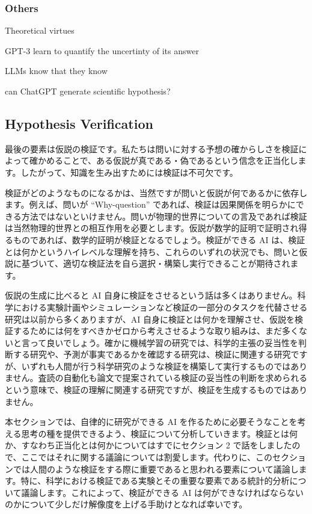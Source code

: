 
\subsubsection{Others}
Theoretical virtues \cite{schindler2022theoretical}

GPT-3 learn to quantify the uncertinty of its answer \cite{lin2022teaching}

LLMs know that they know \cite{kadavath2022language}
 
can ChatGPT generate scientific hypothesis? \cite{park2023can}

\subsection{Hypothesis Verification}
最後の要素は仮説の検証です。私たちは問いに対する予想の確からしさを検証によって確かめることで、ある仮説が真である・偽であるという信念を正当化します。したがって、知識を生み出すためには検証は不可欠です。

検証がどのようなものになるかは、当然ですが問いと仮説が何であるかに依存します。例えば、問いが ``Why-question'' であれば、検証は因果関係を明らかにできる方法ではないといけません。問いが物理的世界についての言及であれば検証は当然物理的世界との相互作用を必要とします。仮説が数学的証明で証明され得るものであれば、数学的証明が検証となるでしょう。検証ができる AI は、検証とは何かというハイレベルな理解を持ち、これらのいずれの状況でも、問いと仮説に基づいて、適切な検証法を自ら選択・構築し実行できることが期待されます。

仮説の生成に比べると AI 自身に検証をさせるという話は多くはありません。科学における実験計画やシミュレーションなど検証の一部分のタスクを代替させる研究は以前から多くありますが、AI 自身に検証とは何かを理解させ、仮説を検証するためには何をすべきかゼロから考えさせるような取り組みは、まだ多くないと言って良いでしょう。確かに機械学習の研究では、科学的主張の妥当性を判断する研究や、予測が事実であるかを確認する研究は、検証に関連する研究ですが、いずれも人間が行う科学研究のような検証を構築して実行するものではありません。査読の自動化も論文で提案されている検証の妥当性の判断を求められるという意味で、検証の理解に関連する研究ですが、検証を生成するものではありません。

本セクションでは、自律的に研究ができる AI を作るために必要そうなことを考える思考の種を提供できるよう、検証について分析していきます。検証とは何か、すなわち正当化とは何かについてはすでにセクション 2 で話をしましたので、ここではそれに関する議論については割愛します。代わりに、このセクションでは人間のような検証をする際に重要であると思われる要素について議論します。特に、科学における検証である実験とその重要な要素である統計的分析について議論します。これによって、検証ができる AI は何ができなければならないのかについて少しだけ解像度を上げる手助けとなれば幸いです。

